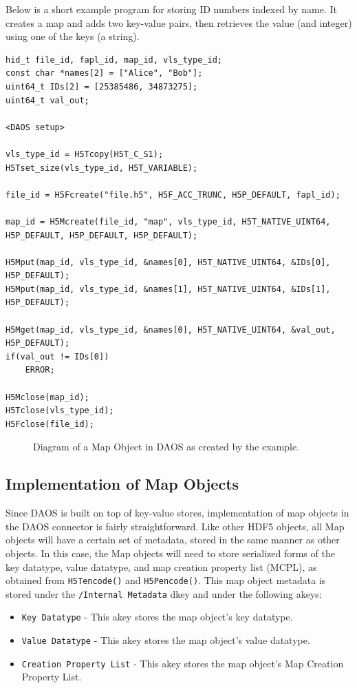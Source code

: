Below is a short example program for storing ID numbers indexed by name. It creates a map and adds two key-value pairs, then retrieves the value (and integer) using one of the keys (a string).
{
\begin{lstlisting}
hid_t file_id, fapl_id, map_id, vls_type_id;
const char *names[2] = ["Alice", "Bob"];
uint64_t IDs[2] = [25385486, 34873275];
uint64_t val_out;

<DAOS setup>

vls_type_id = H5Tcopy(H5T_C_S1);
H5Tset_size(vls_type_id, H5T_VARIABLE);

file_id = H5Fcreate("file.h5", H5F_ACC_TRUNC, H5P_DEFAULT, fapl_id);

map_id = H5Mcreate(file_id, "map", vls_type_id, H5T_NATIVE_UINT64, H5P_DEFAULT, H5P_DEFAULT, H5P_DEFAULT);

H5Mput(map_id, vls_type_id, &names[0], H5T_NATIVE_UINT64, &IDs[0], H5P_DEFAULT);
H5Mput(map_id, vls_type_id, &names[1], H5T_NATIVE_UINT64, &IDs[1], H5P_DEFAULT);

H5Mget(map_id, vls_type_id, &names[0], H5T_NATIVE_UINT64, &val_out, H5P_DEFAULT);
if(val_out != IDs[0])
	ERROR;

H5Mclose(map_id);
H5Tclose(vls_type_id);
H5Fclose(file_id);
\end{lstlisting}
}

\begin{figure}
\caption{Diagram of a Map Object in DAOS as created by the example.}
\label{fig:map}
\end{figure}

\subsection{Implementation of Map Objects}

Since DAOS is built on top of key-value stores, implementation of map objects in the DAOS connector is fairly straightforward. Like other HDF5 objects, all Map objects will have a certain set of metadata, stored in the same manner as other objects. In this case, the Map objects will need to store serialized forms of the key datatype, value datatype, and map creation property list (MCPL), as obtained from \verb+H5Tencode()+ and \verb+H5Pencode()+.
This map object metadata is stored under the \verb+/Internal Metadata+ dkey and under the following akeys:

\begin{itemize}
    \item \verb+Key Datatype+ - This akey stores the map object's key datatype.
    \item \verb+Value Datatype+ - This akey stores the map object's value datatype.
    \item \verb+Creation Property List+ - This akey stores the map object's Map Creation Property List.
\end{itemize}

